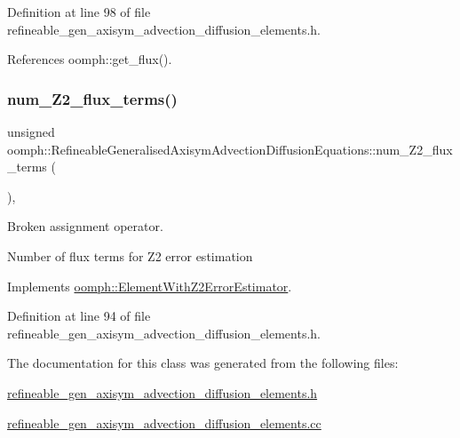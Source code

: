 Definition at line 98 of file refineable\+\_\+gen\+\_\+axisym\+\_\+advection\+\_\+diffusion\+\_\+elements.\+h.



References oomph\+::get\+\_\+flux().

\mbox{\label{classoomph_1_1RefineableGeneralisedAxisymAdvectionDiffusionEquations_afde683f233636a412fea9793d5be89b3}} 
\subsubsection{\texorpdfstring{num\+\_\+\+Z2\+\_\+flux\+\_\+terms()}{num\_Z2\_flux\_terms()}}
{\footnotesize\ttfamily unsigned oomph\+::\+Refineable\+Generalised\+Axisym\+Advection\+Diffusion\+Equations\+::num\+\_\+\+Z2\+\_\+flux\+\_\+terms (\begin{DoxyParamCaption}{ }\end{DoxyParamCaption})\hspace{0.3cm}{\ttfamily [inline]}, {\ttfamily [virtual]}}



Broken assignment operator. 

Number of \textquotesingle{}flux\textquotesingle{} terms for Z2 error estimation 

Implements \hyperlink{classoomph_1_1ElementWithZ2ErrorEstimator_ae82c5728902e13da31be19c390fc28e3}{oomph\+::\+Element\+With\+Z2\+Error\+Estimator}.



Definition at line 94 of file refineable\+\_\+gen\+\_\+axisym\+\_\+advection\+\_\+diffusion\+\_\+elements.\+h.



The documentation for this class was generated from the following files\+:\begin{DoxyCompactItemize}
\item 
\hyperlink{refineable__gen__axisym__advection__diffusion__elements_8h}{refineable\+\_\+gen\+\_\+axisym\+\_\+advection\+\_\+diffusion\+\_\+elements.\+h}\item 
\hyperlink{refineable__gen__axisym__advection__diffusion__elements_8cc}{refineable\+\_\+gen\+\_\+axisym\+\_\+advection\+\_\+diffusion\+\_\+elements.\+cc}\end{DoxyCompactItemize}
